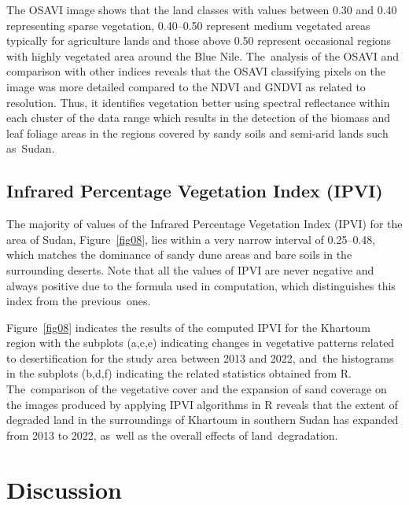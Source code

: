 \documentclass[jimaging,article,accept,pdftex,moreauthors]{Definitions/mdpi}
\begin{document}
The OSAVI image shows that the land classes with values between 0.30 and 0.40 representing sparse vegetation, 0.40--0.50 represent medium vegetated areas typically for agriculture lands and those above 0.50 represent occasional regions with highly vegetated area around the Blue Nile. The~analysis of the OSAVI and comparison with other indices reveals that the OSAVI classifying pixels on the image was more detailed compared to the NDVI and GNDVI as related to resolution. Thus, it identifies vegetation better using spectral reflectance within each cluster of the data range which results in the detection of the biomass and leaf foliage areas in the regions covered by sandy soils and semi-arid lands such as~Sudan. 

\subsection{Infrared Percentage Vegetation Index (IPVI)}

The majority of values of the Infrared Percentage Vegetation Index (IPVI) for the area of Sudan, Figure~\ref{fig08}, lies within a very narrow interval of 0.25--0.48, which matches the dominance of sandy dune areas and bare soils in the surrounding deserts. Note that all the values of IPVI are never negative and always positive due to the formula used in computation, which distinguishes this index from the previous~ones. 


Figure~\ref{fig08} indicates the results of the computed IPVI for the Khartoum region with the subplots (a,c,e) indicating changes in vegetative patterns related to desertification for the study area between 2013 and 2022, and~the histograms in the subplots (b,d,f) indicating the related statistics obtained from R. The~comparison of the vegetative cover and the expansion of sand coverage on the images produced by applying IPVI algorithms in R reveals that the extent of degraded land in the surroundings of Khartoum in southern Sudan has expanded from 2013 to 2022, as~well as the overall effects of land~degradation.

\section{Discussion}\label{sect4}
\end{document}
